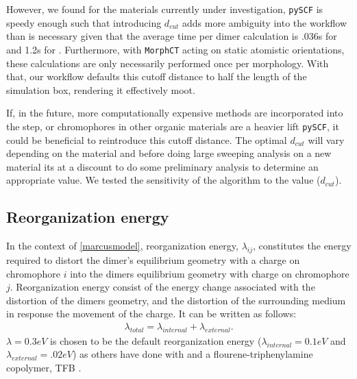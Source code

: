 However, we found for the materials currently under investigation,
\texttt{pySCF} is speedy enough such that introducing $d_{cut}$ adds more ambiguity
into the workflow than is necessary given that the average time per  dimer calculation is .036s for  and
1.2s for . Furthermore, with \texttt{MorphCT} acting on static atomistic orientations, these calculations 
are only necessarily performed once per morphology. With that, our workflow defaults this cutoff distance to half
the length of the simulation box, rendering it effectively moot. 

If, in the future, more computationally expensive methods are incorporated into the  step, or chromophores in other
organic materials are a heavier lift \texttt{pySCF}, it could be beneficial to reintroduce this cutoff distance. The optimal $d_{cut}$ will vary depending on the material and before doing large sweeping analysis on a new
material its at a discount to do some preliminary analysis to determine an appropriate value. We tested the
sensitivity of the algorithm to the value ($d_{cut}$). 

\subsection{Reorganization energy}

In the context of \autoref{marcusmodel}, 
reorganization energy, $\lambda_{ij}$, constitutes the energy required to distort the dimer's equilibrium geometry with a
charge on chromophore $i$ into the dimers equilibrium geometry with charge on chromophore $j$.
Reorganization energy consist of the energy change associated with the distortion of the dimers geometry,
and the distortion of the surrounding medium in response the movement of the charge. It can be written as
follows:
\begin{align}
    \lambda_{total} = \lambda_{internal} + \lambda_{external}.
\end{align} 
$\lambda = 0.3eV$ is chosen to be the default reorganization energy ($\lambda_{internal} = 0.1eV$
and $\lambda_{external} = .02eV$) as others have done with  \cite{Jones2017} and
a flourene-triphenylamine copolymer, TFB \cite{Gali2017}. 

